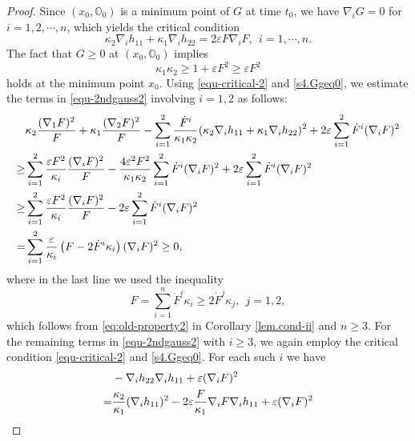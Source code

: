 \documentclass[10pt,a4paper]{amsart}
\begin{document}
\begin{proof}
    Since $(x_0,\mathbb{O}_0)$ is a minimum point of $G$ at time $t_0$, we have $\nabla_i G=0$ for $i=1,2,\cdots,n$, which yields the critical condition
    \begin{equation}
    	\kappa_2 \nabla_i h_{11} + \kappa_1 \nabla_i h_{22} =2\varepsilon F\nabla_i F,\ \ i=1,\cdots,n.
    	\label{equ-critical-2}
    \end{equation} 
	The fact that $G\geq 0$ at $(x_0,\mathbb{O}_0)$ implies 
    \begin{equation}\label{s4.Ggeq0}
        \kappa_1\kappa_2 \geq 1+\varepsilon F^2\geq \varepsilon F^2
    \end{equation}
holds at the minimum point $x_0$.    Using \eqref{equ-critical-2} and \eqref{s4.Ggeq0},  we estimate the terms in \eqref{equ-2ndgauss2} involving $i=1,2$ as follows:
    \begin{align}
    	&\kappa_2 \dfrac{(\nabla_1 F)^2}{F} + \kappa_1 \dfrac{(\nabla_2 F)^2}{F} - \sum\limits_{i=1}^2 \dfrac{\dot{F}^i}{\kappa_1 \kappa_2}(\kappa_2 \nabla_i h_{11}+ \kappa_1 \nabla_i h_{22})^2 + 2\varepsilon \sum\limits_{i=1}^2 \dot{F}^i (\nabla_i F)^2 \nonumber\\
    	\geq & \sum\limits_{i=1}^2 \dfrac{\varepsilon F^2}{\kappa_i}\dfrac{(\nabla_i F)^2}{F} - \dfrac{4\varepsilon^2 F^2}{\kappa_1 \kappa_2} \sum\limits_{i=1}^2 \dot{F}^i (\nabla_i F)^2 +  2\varepsilon \sum\limits_{i=1}^2 \dot{F}^i (\nabla_i F)^2 \nonumber\\
    	\geq & \sum\limits_{i=1}^2 \dfrac{\varepsilon F^2}{\kappa_i}\dfrac{(\nabla_i F)^2}{F} - 2\varepsilon \sum\limits_{i=1}^2 \dot{F}^i (\nabla_i F)^2 \notag\\
    	= & \sum\limits_{i=1}^2 \frac{\varepsilon}{\kappa_i}\left(F-2\dot{F}^{i}\kappa_i\right)(\nabla_i F)^2 \geq 0,
    	\label{equ-est1}
    \end{align}
    where in the last line we used the inequality
    \begin{equation*}
    	F = \sum\limits_{i=1}^n \dot{F}^i \kappa_i \geq 2 \dot{F}^j\kappa_j,\ \ j=1,2,
    \end{equation*}
	which follows from \eqref{eq:old-property2} in Corollary \ref{lem.cond-ii} and $n\geq 3$. For the remaining terms in \eqref{equ-2ndgauss2} with $i\geq 3$, we again employ the critical condition \eqref{equ-critical-2} and \eqref{s4.Ggeq0}.  For each such $i$ we have
    \begin{align*}
    	& -\nabla_i h_{22}\nabla_i h_{11} + \varepsilon (\nabla_i F)^2 \nonumber\\
    	=& \dfrac{\kappa_2}{\kappa_1}(\nabla_i h_{11})^2 - 2\varepsilon\dfrac{F}{\kappa_1}\nabla_i F \nabla_i h_{11} + \varepsilon(\nabla_i F)^2 \notag\\

\end{align*}
\end{proof}
\end{document}
